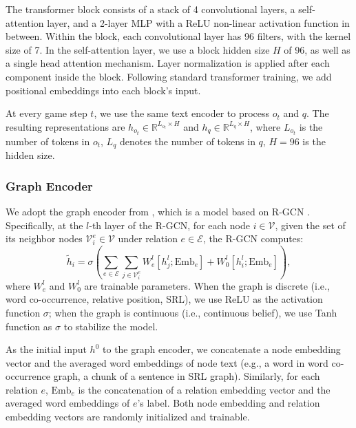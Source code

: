 \documentclass[11pt]{article}
\begin{document}
The transformer block consists of a stack of 4 convolutional layers, a self-attention layer, and a 2-layer MLP with a ReLU non-linear activation function in between. 
Within the block, each convolutional layer has 96 filters, with the kernel size of 7.
In the self-attention layer, we use a block hidden size $H$ of 96, as well as a single head attention mechanism.
Layer normalization \citep{ba16layernorm} is applied after each component inside the block. 
Following standard transformer training, we add positional embeddings into each block's input.

At every game step $t$, we use the same text encoder to process $o_t$ and $q$. 
The resulting representations are $h_{o_t} \in \mathbb{R}^{L_{o_t} \times H}$ and $h_{q} \in \mathbb{R}^{L_q \times H}$, where $L_{o_t}$ is the number of tokens in $o_t$, $L_q$ denotes the number of tokens in $q$, $H = 96$ is the hidden size.

\subsubsection{Graph Encoder}

We adopt the graph encoder from \citep{adhikari2020gata}, which is a model based on R-GCN \citep{schlichtkrull2018rgcn}.
Specifically, at the $l$-th layer of the R-GCN, for each node $i \in \mathcal{V}$, given the set of its neighbor nodes $\mathcal{V}^e_i \in \mathcal{V}$ under relation $e \in \mathcal{E}$, the R-GCN computes:
\begin{equation}
    \tilde{h}_i = \sigma\left(\sum_{e\in \mathcal{E}}\sum_{j\in \mathcal{V}^e_i} W^{l}_e [h^{l}_j; \text{Emb}_e] + W^{l}_0 [h^{l}_i; \text{Emb}_e]\right),
\end{equation}
where $W^{l}_e$ and $W^{l}_0$ are trainable parameters.
When the graph is discrete (i.e., word co-occurrence, relative position, SRL), we use ReLU as the activation function $\sigma$; when the graph is continuous (i.e., continuous belief), we use Tanh function as $\sigma$ to stabilize the model.

As the initial input $h^{0}$ to the graph encoder, we concatenate a node embedding vector and the averaged word embeddings of node text (e.g., a word in word co-occurrence graph, a chunk of a sentence in SRL graph).
Similarly, for each relation $e$, $\text{Emb}_e$ is the concatenation of a relation embedding vector and the averaged word embeddings of $e$'s label.
Both node embedding and relation embedding vectors are randomly initialized and trainable.
\end{document}
